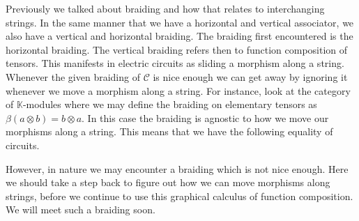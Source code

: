 \documentclass[../thesis.tex]{subfiles}
\begin{document}
            Previously we talked about braiding and how that relates to interchanging strings. In the same manner that we have a horizontal and vertical associator, we also have a vertical and horizontal braiding. The braiding first encountered is the horizontal braiding. The vertical braiding refers then to function composition of tensors. This manifests in electric circuits as sliding a morphism along a string. Whenever the given braiding of $\mathcal{C}$ is nice enough we can get away by ignoring it whenever we move a morphism along a string. For instance, look at the category of $\mathbb{K}$-modules where we may define the braiding on elementary tensors as $\beta (a\otimes b) = b\otimes a$. In this case the braiding is agnostic to how we move our morphisms along a string. This means that we have the following equality of circuits.
            \begin{center}
            \end{center}

            However, in nature we may encounter a braiding which is not nice enough. Here we should take a step back to figure out how we can move morphisms along strings, before we continue to use this graphical calculus of function composition. We will meet such a braiding soon.
            
\end{document}

